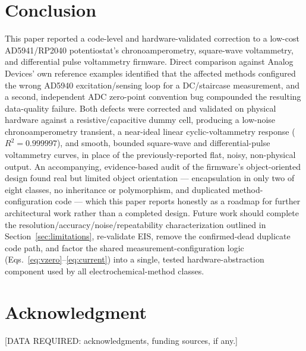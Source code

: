 \documentclass[preprint,12pt]{elsarticle}
\begin{document}
\section{Conclusion}
This paper reported a code-level and hardware-validated correction to a low-cost AD5941/RP2040 potentiostat's chronoamperometry, square-wave voltammetry, and differential pulse voltammetry firmware. Direct comparison against Analog Devices' own reference examples identified that the affected methods configured the wrong AD5940 excitation/sensing loop for a DC/staircase measurement, and a second, independent ADC zero-point convention bug compounded the resulting data-quality failure. Both defects were corrected and validated on physical hardware against a resistive/capacitive dummy cell, producing a low-noise chronoamperometry transient, a near-ideal linear cyclic-voltammetry response ($R^2=0.999997$), and smooth, bounded square-wave and differential-pulse voltammetry curves, in place of the previously-reported flat, noisy, non-physical output. An accompanying, evidence-based audit of the firmware's object-oriented design found real but limited object orientation --- encapsulation in only two of eight classes, no inheritance or polymorphism, and duplicated method-configuration code --- which this paper reports honestly as a roadmap for further architectural work rather than a completed design. Future work should complete the resolution/accuracy/noise/repeatability characterization outlined in Section~\ref{sec:limitations}, re-validate EIS, remove the confirmed-dead duplicate code path, and factor the shared measurement-configuration logic (Eqs.~\eqref{eq:vzero}--\eqref{eq:current}) into a single, tested hardware-abstraction component used by all electrochemical-method classes.

\section*{Acknowledgment}
[DATA REQUIRED: acknowledgments, funding sources, if any.]
\end{document}
